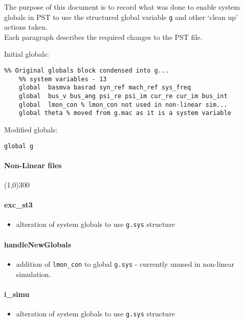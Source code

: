 \documentclass[12pt]{article}
\begin{document}
The purpose of this document is to record what was done to enable system globals in PST to use the structured global variable \verb|g| and other `clean up' actions taken. \\
Each paragraph describes the required changes to the PST file.

Initial globals:
\begin{verbatim}
%% Original globals block condensed into g...
    %% system variables - 13
    global  basmva basrad syn_ref mach_ref sys_freq
    global  bus_v bus_ang psi_re psi_im cur_re cur_im bus_int
    global  lmon_con % lmon_con not used in non-linear sim...
    global theta % moved from g.mac as it is a system variable
\end{verbatim}

Modified globals:
\begin{verbatim}
global g
\end{verbatim}
\paragraph{Non-Linear files}\line(1,0){300}
\paragraph{exc\_st3}
	\begin{itemize}
		\item alteration of system globals to use \verb|g.sys| structure
	\end{itemize}
\paragraph{handleNewGlobals}
	\begin{itemize}
		\item addition of \verb|lmon_con| to global \verb|g.sys| - currently unused in non-linear simulation.
	\end{itemize}
\paragraph{i\_simu}
	\begin{itemize}
		\item alteration of system globals to use \verb|g.sys| structure
	\end{itemize}
\end{document}
